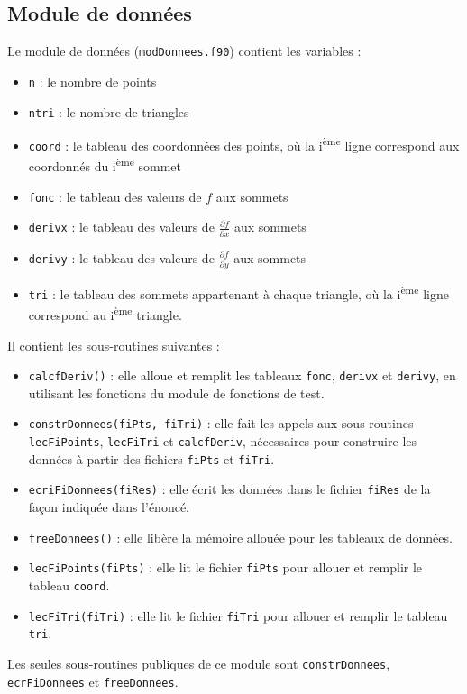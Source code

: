 \documentclass[12 pt]{article}
\newcommand{\up}[1]{\textsuperscript{#1}}
\begin{document}
\subsection{Module de données}
Le module de données (\texttt{modDonnees.f90}) contient les variables :
\begin{itemize}
	\item \texttt{n} : le nombre de points
	\item \texttt{ntri} : le nombre de triangles
	\item \texttt{coord} : le tableau des coordonnées des points, où la i\up{ème} ligne correspond aux coordonnés du i\up{ème} sommet
	\item \texttt{fonc} : le tableau des valeurs de $f$ aux sommets
	\item \texttt{derivx} : le tableau des valeurs de $\frac{\partial{f}}{\partial{x}}$ aux sommets
	\item \texttt{derivy} : le tableau des valeurs de $\frac{\partial{f}}{\partial{y}}$ aux sommets
	\item \texttt{tri} : le tableau des sommets appartenant à chaque triangle, où la i\up{ème} ligne correspond au i\up{ème} triangle.
\end{itemize}
Il contient les sous-routines suivantes : 
\begin{itemize}
	\item \texttt{calcfDeriv()} : elle alloue et remplit les tableaux \texttt{fonc}, \texttt{derivx} et \texttt{derivy}, en utilisant les fonctions du module de fonctions de test.
	\item  \texttt{constrDonnees(fiPts, fiTri)} : elle fait les appels aux sous-routines \texttt{lecFiPoints}, \texttt{lecFiTri} et \texttt{calcfDeriv}, nécessaires pour construire les données à partir des fichiers \texttt{fiPts} et \texttt{fiTri}.
	\item \texttt{ecriFiDonnees(fiRes)} : elle écrit les données dans le fichier \texttt{fiRes} de la façon indiquée dans l'énoncé.
	\item \texttt{freeDonnees()} : elle libère la mémoire allouée pour les tableaux de données.
	\item \texttt{lecFiPoints(fiPts)} : elle lit le fichier \texttt{fiPts} pour allouer et remplir le tableau \texttt{coord}.
	\item \texttt{lecFiTri(fiTri)} : elle lit le fichier \texttt{fiTri} pour allouer et remplir le tableau \texttt{tri}.
\end{itemize}
Les seules sous-routines publiques de ce module sont \texttt{constrDonnees}, \texttt{ecrFiDonnees} et \texttt{freeDonnees}.
\end{document}
